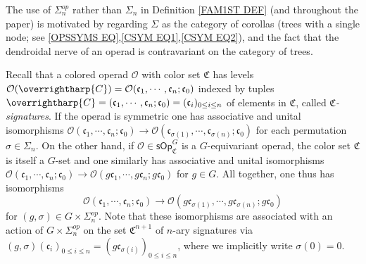 \documentclass[a4paper,10pt
,draft
]{article}%
\numberwithin{equation}{section}
\numberwithin{figure}{section}
\theoremstyle{definition} %
\newcommand{\vect}[1]{\text{\overrightharp{\ensuremath{#1}}}}
\renewcommand{\O}{\ensuremath{\mathcal O}}
\newcommand{\1}{\ensuremath{\mathbbm 1}}%
\begin{document}
The use of $\Sigma_n^{op}$ rather than $\Sigma_n$
in Definition \ref{FAM1ST DEF} 
(and throughout the paper) 
is motivated by regarding $\Sigma$
as the category of corollas (trees with a single node; 
see \eqref{OPSSYMS EQ},\eqref{CSYM EQ1},\eqref{CSYM EQ2}),
and the fact that the dendroidal nerve \cite[\S 1]{MW07} of an operad is contravariant on the category of trees.





Recall that a colored operad $\O$
with color set $\mathfrak{C}$ has levels 
$
\O(\vect{C})=
\O(\mathfrak{c}_1,\cdots,\mathfrak{c}_n;\mathfrak{c}_0)$
indexed by tuples
$\vect{C} = (\mathfrak{c}_1,\cdots,\mathfrak{c}_n;\mathfrak{c}_0) = (\mathfrak c_i)_{0 \leq i \leq n}$
of elements in $\mathfrak{C}$, called \emph{$\mathfrak{C}$-signatures}.
If the operad is symmetric one has associative and unital isomorphisms
$
\O(\mathfrak{c}_1,\cdots,\mathfrak{c}_n;\mathfrak{c}_0) \to 
\O(\mathfrak{c}_{\sigma(1)},\cdots,\mathfrak{c}_{\sigma(n)};\mathfrak{c}_0)
$
for each permutation $\sigma \in \Sigma_n$.
On the other hand, if 
$\O \in \mathsf{sOp}^G_{\mathfrak{C}}$
is a $G$-equivariant operad, 
the color set $\mathfrak{C}$ is itself a $G$-set
and one similarly has associative and unital isomorphisms
$
\O(\mathfrak{c}_1,\cdots,\mathfrak{c}_n;\mathfrak{c}_0) \to 
\O(g\mathfrak{c}_{1},\cdots,g\mathfrak{c}_{n};g\mathfrak{c}_0)
$ for $g \in G$.
All together, one thus has isomorphisms
\begin{equation}\label{OPSSYMS EQ}
\O(\mathfrak{c}_1,\cdots,\mathfrak{c}_n;\mathfrak{c}_0)
\to 
\O(g \mathfrak{c}_{\sigma(1)},\cdots,g \mathfrak{c}_{\sigma(n)};g\mathfrak{c}_0)
\end{equation}
for $(g,\sigma) \in G \times \Sigma_n^{op}$.
Note that these isomorphisms 
are associated with an action of 
$G \times \Sigma_n^{op}$
on the set $\mathfrak{C}^{n+1}$ of $n$-ary signatures via
$(g,\sigma) (\mathfrak{c}_i)_{0\leq i \leq n}
= (g \mathfrak{c}_{\sigma(i)})_{0\leq i \leq n}$,
where we implicitly write $\sigma(0)=0$.
\end{document}
